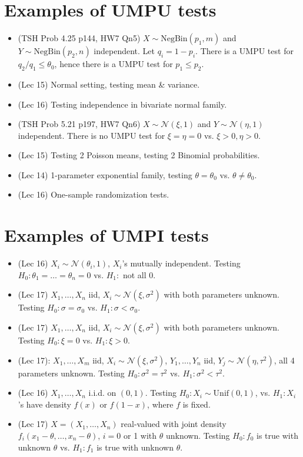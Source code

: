 \documentclass[twoside]{article}
\newcommand\calN{\mathcal{N}}
\newcommand\sg{\sigma}
\def\t{\theta}
\begin{document}
\section*{Examples of UMPU tests}
\begin{itemize}
\item (TSH Prob 4.25 p144, HW7 Qn5) $X \sim \text{NegBin}(p_1,m)$ and $Y \sim \text{NegBin}(p_2,n)$ independent. Let $q_i = 1-p_i$. There is a UMPU test for $q_2/q_1 \leq \t_0$, hence there is a UMPU test for $p_1 \leq p_2$.

\item (Lec 15) Normal setting, testing mean \& variance.

\item (Lec 16) Testing independence in bivariate normal family.

\item (TSH Prob 5.21 p197, HW7 Qn6) $X \sim \calN(\xi, 1)$ and $Y \sim \calN(\eta, 1)$ independent. There is no UMPU test for $\xi = \eta = 0$ vs. $\xi > 0, \eta > 0$.

\item (Lec 15) Testing 2 Poisson means, testing 2 Binomial probabilities.

\item (Lec 14) 1-parameter exponential family, testing $\t = \t_0$ vs. $\t \neq \t_0$.

\item (Lec 16) One-sample randomization tests.
\end{itemize}


\section*{Examples of UMPI tests}
\begin{itemize}
\item (Lec 16) $X_i \sim \calN(\t_i, 1)$, $X_i$'s mutually independent. Testing $H_0: \t_1 = \dots = \t_n = 0$ vs. $H_1:$ not all 0.

\item (Lec 17) $X_1, \dots, X_n$ iid, $X_i \sim \calN(\xi, \sg^2)$ with both parameters unknown. Testing $H_0: \sg = \sg_0$ vs. $H_1: \sg < \sg_0$.

\item (Lec 17) $X_1, \dots, X_n$ iid, $X_i \sim \calN(\xi, \sg^2)$ with both parameters unknown. Testing $H_0: \xi = 0$ vs. $H_1: \xi > 0$.

\item (Lec 17): $X_1, \dots, X_m$ iid, $X_i \sim \calN(\xi, \sg^2)$, $Y_1, \dots, Y_n$ iid, $Y_j \sim \calN(\eta, \tau^2)$, all 4 parameters unknown. Testing $H_0: \sg^2 = \tau^2$ vs. $H_1: \sg^2 < \tau^2$.

\item (Lec 16) $X_1, \dots, X_n$ i.i.d. on $(0,1)$. Testing $H_0: X_i \sim \text{Unif}(0,1)$, vs. $H_1: X_i$'s have density $f(x)$ or $f(1-x)$, where $f$ is fixed.

\item (Lec 17) $X = (X_1, \dots, X_n)$ real-valued with joint density $f_i(x_1 - \t, \dots, x_n - \t)$, $i = 0$ or 1 with $\t$ unknown. Testing $H_0: f_0$ is true with unknown $\t$ vs. $H_1: f_1$ is true with unknown $\t$.
\end{itemize}
\end{document}
